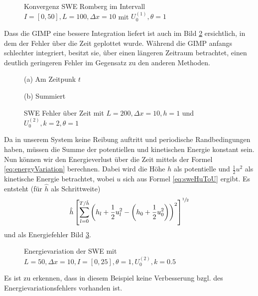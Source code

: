 \begin{figure}
\centering

\caption{Konvergenz SWE Romberg im Intervall $I = [0,50], L=100, \Delta x=10$ mit $U_0^{(1)},\theta=1$}
\label{fig:sweConvergenceRomberg}
\end{figure}
Dass die GIMP eine bessere Integration liefert ist auch im Bild \ref{fig:sweErrorOverTime} ersichtlich, in dem der Fehler über die Zeit geplottet wurde. Während die GIMP anfangs schlechter integriert, besitzt sie, über einen längeren Zeitraum betrachtet, einen deutlich geringeren Fehler im Gegensatz zu den anderen Methoden.

\begin{figure}
\footnotesize
\begin{minipage}[b]{0.49\linewidth}
\centering

\caption*{(a) Am Zeitpunk $t$}
\end{minipage}
\begin{minipage}[b]{0.49\linewidth}
\centering

\caption*{(b) Summiert}
\end{minipage}
\caption{SWE Fehler über Zeit mit $L=200,\Delta x=10,h = 1$ und $U_0^{(2)},k=2,\theta=1$}
\label{fig:sweErrorOverTime}
\end{figure}
Da in unserem System keine Reibung auftritt und periodische Randbedingungen haben, müssen die Summe der potentiellen und kinetischen Energie konstant sein. Nun können wir den Energieverlust über die Zeit mittels der Formel \eqref{eq:energyVariation} berechnen. Dabei wird die Höhe $h$ als potentielle und $\frac{1}{2}u^2$ als kinetische Energie betrachtet, wobei $u$ sich aus Formel \eqref{eq:sweHuToU} ergibt. Es entsteht (für $\hat h$ als Schrittweite)
\[
 \hat h \left[\sum_{l=0}^{T/\hat h} \left( h_l + \frac{1}{2} u_l^2 - \left(h_0 + \frac{1}{2} u_0^2\right)\right)^2\right]^{\sfrac{1}{2}}
\]
und als Energiefehler Bild \ref{fig:sweEnergyVariation}.
\begin{figure}
\centering

\caption{Energievariation der SWE mit $L=50,\Delta x = 10, I = [0,25],\theta=1,U_0^{(2)},k=0.5$}
\label{fig:sweEnergyVariation}
\end{figure}
Es ist zu erkennen, dass in diesem Beispiel keine Verbesserung bzgl. des Energievariationsfehlers vorhanden ist.
